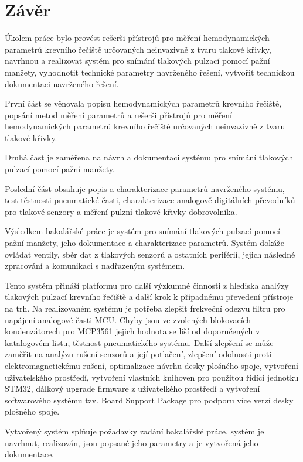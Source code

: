\documentclass{ctuthesis}
\begin{document}
\chapter{Závěr}
Úkolem práce bylo provést rešerši přístrojů pro měření hemodynamických parametrů krevního řečiště určovaných neinvazivně z tvaru
tlakové křivky, navrhnou a realizovat systém pro snímání tlakových pulzací pomocí pažní manžety, vyhodnotit technické parametry navrženého řešení, vytvořit technickou dokumentaci navrženého řešení.
\par
První část se věnovala popisu hemodynamických parametrů krevního řečiště, popsání metod měření parametrů a rešerši přístrojů pro měření hemodynamických parametrů krevního řečiště určovaných neinvazivně z tvaru
tlakové křivky.
\par
Druhá čast je zaměřena na návrh a dokumentaci systému pro snímání tlakových pulzací pomocí pažní manžety.
\par
Poslední část obsahuje popis a charakterizace parametrů navrženého systému, test těstnosti pneumatické časti, charakterizace analogově digitálních převodníků pro tlakové senzory a měření pulzní tlakové křivky dobrovolníka.
\par
Výsledkem bakalářské práce je systém pro snímání tlakových pulzací pomocí pažní manžety, jeho dokumentace a charakterizace parametrů. Systém dokáže ovládat ventily, sběr dat z tlakových senzorů a ostatních periférií, jejich následné zpracování a komunikaci s nadřazeným systémem.
\par
Tento systém přináší platformu pro další výzkumné činnosti z hlediska analýzy tlakových pulzací krevního řečiště a další krok k případnému převedení přístroje na trh. Na realizovaném systému je potřeba zlepšit frekveční odezvu filtru pro napájení analogové časti MCU. Chyby jsou ve zvolených blokovacích kondenzátorech
pro MCP3561 jejich hodnota se liší od doporučených v katalogovém listu, těstnost pneumatického systému. Další zlepšení se může zaměřit na analýzu rušení senzorů a její potlačení, zlepšení odolnosti proti elektromagnetickému rušení, optimalizace návrhu desky plošného spoje, vytvoření uživatelského prostředí, vytvoření vlastních knihoven pro použitou
řídící jednotku STM32, dálkový upgrade firmware z uživatelkého prostředí a vytvoření softwarového systému tzv. Board Support Package pro podporu více verzí desky plošného spoje.
\par
Vytvořený systém splňuje požadavky zadání bakalářské práce, systém je navrhnut, realizován, jsou popsané jeho parametry a je vytvořená jeho dokumentace.
\end{document}
